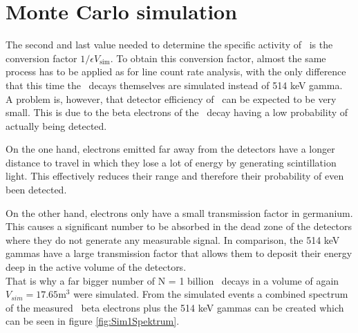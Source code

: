 






















\section{Monte Carlo simulation}
\label{sec:MonteCarlo2}

The second and last value needed to determine the specific activity of \Kr\ is the conversion factor $1/\epsilon V_{\mathrm{sim}}$.
To obtain this conversion factor, almost the same process has to be applied as for line count rate analysis, with the only difference that this time the \Kr\ decays themselves are simulated instead of 514 keV gamma.
\\

A problem is, however, that detector efficiency of \Kr\ can be expected to be very small.
This is due to the beta electrons of the \Kr\ decay having a low probability of actually being detected.

On the one hand, electrons emitted far away from the detectors have a longer distance to travel in which they lose a lot of energy by generating scintillation light.
This effectively reduces their range and therefore their probability of even been detected.

On the other hand, electrons only have a small transmission factor in germanium.
This causes a significant number to be absorbed in the dead zone of the detectors where they do not generate any measurable signal.
In comparison, the 514 keV gammas have a large transmission factor that allows them to deposit their energy deep in the active volume of the detectors.
\\



That is why a far bigger number of N = 1 billion \Kr\ decays in a volume of again $V_{sim} = 17.65 \mathrm{m}^3$ were simulated.
From the simulated events  a combined spectrum of the measured \Kr\ beta electrons plus the 514 keV gammas can be created which can be seen in figure \ref{fig:Sim1Spektrum}.
\\

